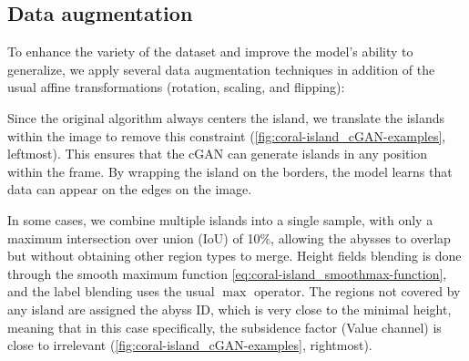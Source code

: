 \documentclass{egpubl}
\begin{document}

\subsection{Data augmentation}
\label{sec:coral-island_data-augmentation}


To enhance the variety of the dataset and improve the model's ability to generalize, we apply several data augmentation techniques in addition of the usual affine transformations (rotation, scaling, and flipping):
\begin{Itemize}
         Since the original algorithm always centers the island, we translate the islands within the image to remove this constraint (\cref{fig:coral-island_cGAN-examples}, leftmost). This ensures that the cGAN can generate islands in any position within the frame. By wrapping the island on the borders, the model learns that data can appear on the edges on the image.


         In some cases, we combine multiple islands into a single sample, with only a maximum intersection over union (IoU) of 10\%, allowing the abysses to overlap but without obtaining other region types to merge. Height fields blending is done through the smooth maximum function \cref{eq:coral-island_smoothmax-function}, and the label blending uses the usual $\max$ operator. The regions not covered by any island are assigned the abyss ID, which is very close to the minimal height, meaning that in this case specifically, the subsidence factor (Value channel) is close to irrelevant (\cref{fig:coral-island_cGAN-examples}, rightmost). 
\end{Itemize}
\end{document}
